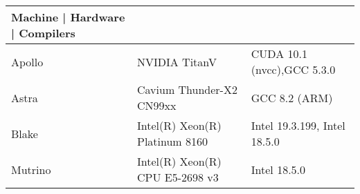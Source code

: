 \begin{tabular}{|l|l|l|}
\hline
Machine | Hardware | Compilers \\
\hline
Apollo & NVIDIA TitanV & CUDA 10.1 (nvcc),GCC 5.3.0 \\
Astra & Cavium Thunder-X2 CN99xx & GCC 8.2 (ARM) \\ 
Blake & Intel(R) Xeon(R) Platinum 8160 & Intel 19.3.199, Intel 18.5.0 \\
Mutrino & Intel(R) Xeon(R) CPU E5-2698 v3 & Intel 18.5.0 \\
\hline
\end{tabular}

